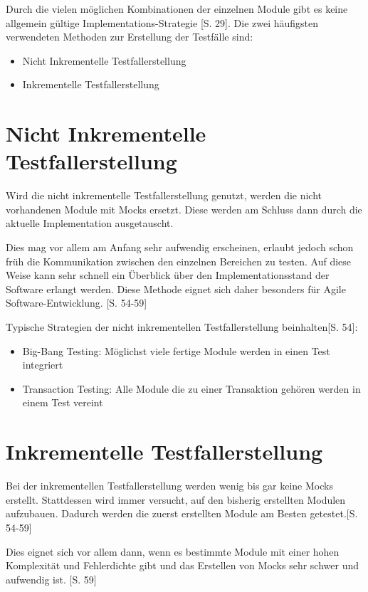 \documentclass[a4paper,bibtotoc,oneside]{scrbook}
\begin{document}
Durch die vielen möglichen Kombinationen der einzelnen Module gibt es keine allgemein gültige Implementations-Strategie \cite{betrieb}[S. 29]. Die zwei häufigsten verwendeten Methoden zur Erstellung der Testfälle sind:

\begin{itemize}
	\item Nicht Inkrementelle Testfallerstellung
	\item Inkrementelle Testfallerstellung
\end{itemize}

\section{Nicht Inkrementelle Testfallerstellung}
Wird die nicht inkrementelle Testfallerstellung genutzt, werden die nicht vorhandenen Module mit Mocks ersetzt. Diese werden am Schluss dann durch die aktuelle Implementation ausgetauscht.

Dies mag vor allem am Anfang sehr aufwendig erscheinen, erlaubt jedoch schon früh die Kommunikation zwischen den einzelnen Bereichen zu testen. Auf diese Weise kann sehr schnell ein Überblick über den Implementationsstand der Software erlangt werden. Diese Methode eignet sich daher besonders für Agile Software-Entwicklung. \cite{test_large_systems}[S. 54-59] 

Typische Strategien der nicht inkrementellen Testfallerstellung beinhalten\cite{test_large_systems}[S. 54]:

\begin{itemize}
  \item Big-Bang Testing: Möglichst viele fertige Module werden in einen Test integriert
  \item Transaction Testing: Alle Module die zu einer Transaktion gehören werden in einem Test vereint
\end{itemize}


\section{Inkrementelle Testfallerstellung}
Bei der inkrementellen Testfallerstellung werden wenig bis gar keine Mocks erstellt. Stattdessen wird immer versucht, auf den bisherig erstellten Modulen aufzubauen. Dadurch werden die zuerst erstellten Module am Besten getestet.\cite{test_large_systems}[S. 54-59]

Dies eignet sich vor allem dann, wenn es bestimmte Module mit einer hohen Komplexität und Fehlerdichte gibt und das Erstellen von Mocks sehr schwer und aufwendig ist. \cite{test_large_systems}[S. 59]
\end{document}

